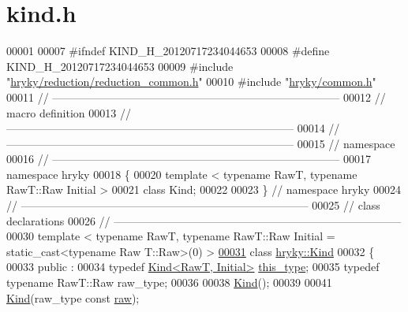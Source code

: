 \hypertarget{kind_8h_source}{\section{kind.\-h}
}

\begin{DoxyCode}
00001 
00007 \textcolor{preprocessor}{#ifndef KIND\_H\_20120717234044653}
00008 \textcolor{preprocessor}{}\textcolor{preprocessor}{#define KIND\_H\_20120717234044653}
00009 \textcolor{preprocessor}{}\textcolor{preprocessor}{#include "\hyperlink{reduction__common_8h}{hryky/reduction/reduction_common.h}"}
00010 \textcolor{preprocessor}{#include "\hyperlink{common_8h}{hryky/common.h}"}
00011 \textcolor{comment}{//
      ------------------------------------------------------------------------------}
00012 \textcolor{comment}{// macro definition}
00013 \textcolor{comment}{//
      ------------------------------------------------------------------------------}
00014 \textcolor{comment}{//
      ------------------------------------------------------------------------------}
00015 \textcolor{comment}{// namespace}
00016 \textcolor{comment}{//
      ------------------------------------------------------------------------------}
00017 \textcolor{keyword}{namespace }hryky
00018 \{
00020     \textcolor{keyword}{template} < \textcolor{keyword}{typename} RawT, \textcolor{keyword}{typename} RawT::Raw Initial >
00021     \textcolor{keyword}{class }Kind;
00022 
00023 \} \textcolor{comment}{// namespace hryky}
00024 \textcolor{comment}{//
      ------------------------------------------------------------------------------}
00025 \textcolor{comment}{// class declarations}
00026 \textcolor{comment}{//
      ------------------------------------------------------------------------------}
00030 \textcolor{comment}{}\textcolor{keyword}{template} < \textcolor{keyword}{typename} RawT, \textcolor{keyword}{typename} RawT::Raw Initial = static\_cast<\textcolor{keyword}{typename} Raw
      T::Raw>(0) >
\hypertarget{kind_8h_source_l00031}{}\hyperlink{classhryky_1_1_kind}{00031} \textcolor{keyword}{class }\hyperlink{classhryky_1_1_kind}{hryky::Kind}
00032 \{
00033 \textcolor{keyword}{public} :
00034     \textcolor{keyword}{typedef} \hyperlink{classhryky_1_1_kind}{Kind<RawT, Initial>} \hyperlink{classhryky_1_1_kind}{this_type};
00035     \textcolor{keyword}{typedef} \textcolor{keyword}{typename} RawT::Raw raw\_type;
00036 
00038     \hyperlink{classhryky_1_1_kind_a7227a84a0d37701c73b1a0018885532d}{Kind}();
00039 
00041     \hyperlink{classhryky_1_1_kind_a7227a84a0d37701c73b1a0018885532d}{Kind}(raw\_type \textcolor{keyword}{const} \hyperlink{classhryky_1_1_kind_a092c3dbb200b1fc4e83bebff274ba23e}{raw});

\end{DoxyCode}
